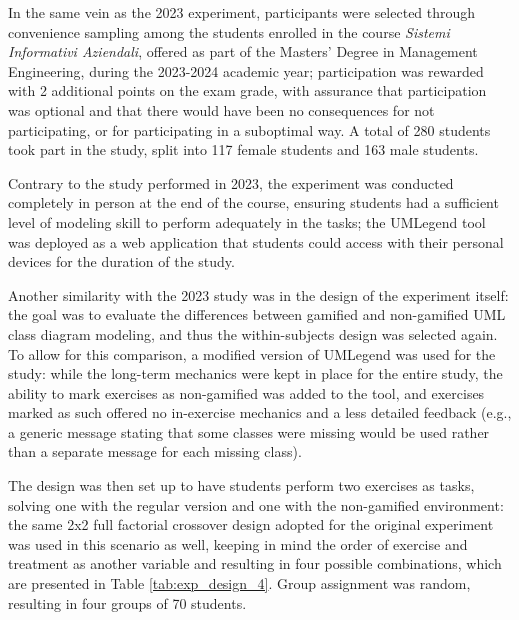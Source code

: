 In the same vein as the 2023 experiment, participants were selected through convenience sampling among the students enrolled in the course \textit{Sistemi Informativi Aziendali}, offered as part of the Masters' Degree in Management Engineering, during the 2023-2024 academic year; participation was rewarded with 2 additional points on the exam grade, with assurance that participation was optional and that there would have been no consequences for not participating, or for participating in a suboptimal way. A total of 280 students took part in the study, split into 117 female students and 163 male students.

Contrary to the study performed in 2023, the experiment was conducted completely in person at the end of the course, ensuring students had a sufficient level of modeling skill to perform adequately in the tasks; the UMLegend tool was deployed as a web application that students could access with their personal devices for the duration of the study.

Another similarity with the 2023 study was in the design of the experiment itself: the goal was to evaluate the differences between gamified and non-gamified UML class diagram modeling, and thus the within-subjects design was selected again. To allow for this comparison, a modified version of UMLegend was used for the study: while the long-term mechanics were kept in place for the entire study, the ability to mark exercises as non-gamified was added to the tool, and exercises marked as such offered no in-exercise mechanics and a less detailed feedback (e.g., a generic message stating that some classes were missing would be used rather than a separate message for each missing class).

The design was then set up to have students perform two exercises as tasks, solving one with the regular version and one with the non-gamified environment: the same 2x2 full factorial crossover design adopted for the original experiment was used in this scenario as well, keeping in mind the order of exercise and treatment as another variable and resulting in four possible combinations, which are presented in Table \ref{tab:exp_design_4}. Group assignment was random, resulting in four groups of 70 students.

